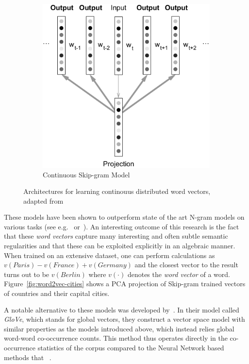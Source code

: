 \begin{figure}[h]
\begin{subfigure}[b]{0.49\textwidth}
        \includegraphics[width=\textwidth]{img/skip-gram_vert2.pdf}
        \caption{Continuous Skip-gram Model}
\label{fig:skip-gram}
    \end{subfigure}
    \caption{Architectures for learning continouus distributed word vectors, adapted from~\cite{Mikolov:2013ad}}
\label{fig:cbow-skip-gram}
\end{figure}

These models have been shown to outperform state of the art N-gram models on various tasks (see e.g.~\cite{bengio2003neural} or~\cite{Mikolov:2012aa}). An interesting outcome of this research is the fact that these \emph{word vectors} capture many interesting and often subtle semantic regularities and that these can be exploited explicitly in an algebraic manner. When trained on an extensive dataset, one can perform calculations as $v(Paris) - v(France) + v(Germany)$ and the closest vector to the result turns out to be $v(Berlin)$ where $v(\cdot)$ denotes the \emph{word vector} of a word. Figure~\ref{fig:word2vec-cities} shows a PCA projection of Skip-gram trained vectors of countries and their capital cities.


A notable alternative to these models was developed by~\cite{Pennington:2014aa}. In their model called \emph{GloVe}, which stands for global vectors, they construct a vector space model with similar properties as the models introduced above, which instead relies global word-word co-occurrence counts. This method thus operates directly in the co-occurrence statistics of the corpus compared to the Neural Network based methods that ~\cite{Pennington:2014aa}.


